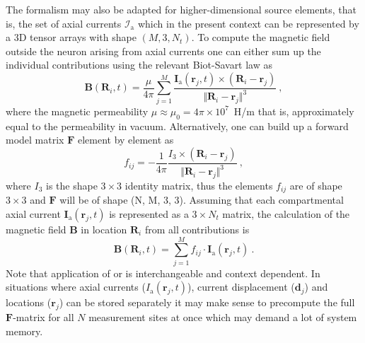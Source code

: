 The formalism may also be adapted for higher-dimensional source elements, that is,
the set of axial currents $\mathcal{I}_\mathrm{a}$ which in the present context can be represented by a 3D tensor arrays with shape $(M, 3, N_t)$.
To compute the magnetic field outside the neuron arising from axial currents one can
either sum up the individual contributions using the relevant Biot-Savart law \cite{Blagoev2007,Hagen2018} as
%
\begin{equation}
\mathbf{B}(\mathbf{R}_i, t) = \frac{\mu}{4\pi} \sum_{j=1}^M \frac{\mathbf{I}_\mathrm{a}(\mathbf{r}_j, t) \times (\mathbf{R}_i - \mathbf{r}_j) }{\Vert \mathbf{R}_i - \mathbf{r}_j \Vert^3} ~,
\label{eq:LFPy_biotsavart1}
\end{equation}
%
where the magnetic permeability $\mu \approx \mu_0=4\pi\times 10^7$~\si{\henry/\metre} that is, approximately equal to the permeability in vacuum.
Alternatively,
one can build up a forward model matrix $\mathbf{F}$ element by element as
%
\begin{equation}
f_{ij} = - \frac{1}{4\pi} \frac{I_3 \times (\mathbf{R}_i - \mathbf{r}_j) }{\Vert \mathbf{R}_i - \mathbf{r}_j \Vert^3} ~,
\label{eq:LFPy_biotsavart2}
\end{equation}
%
where $I_3$ is the shape $3 \times 3$ identity matrix,
thus the elements $f_{ij}$ are of shape $3 \times 3$ and $\mathbf{F}$ will be of shape (N, M, 3, 3).
Assuming that each compartmental axial current $\mathbf{I}_\mathrm{a}(\mathbf{r}_j, t)$ is represented as a $3 \times N_t$ matrix,
the calculation of the magnetic field $\mathbf{B}$ in location $\mathbf{R}_i$ from all contributions is
%
\begin{equation}
\mathbf{B}(\mathbf{R}_i, t) = \sum_{j=1}^M f_{ij} \cdot \mathbf{I}_\mathrm{a}(\mathbf{r}_j, t) ~.
\label{eq:LFPy_biotsavart3}
\end{equation}
%
Note that application of  or  is interchangeable and context dependent.
In situations where axial currents ($I_\mathrm{a}(\mathbf{r}_j, t)$),
current displacement ($\mathbf{d}_j$) and locations ($\mathbf{r}_j$) can be stored separately it may make sense to precompute the full $\mathbf{F}$-matrix for all $N$ measurement sites at once which may demand a lot of system memory.




